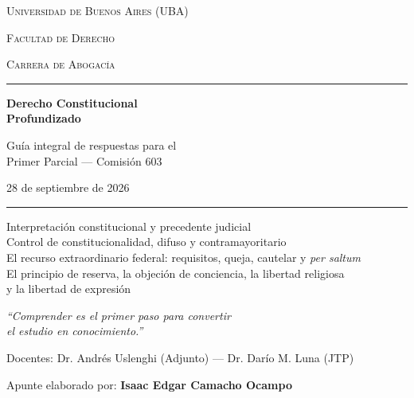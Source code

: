 \documentclass[12pt,oneside]{book}
\begin{document}
\begin{titlepage}
\centering
\vspace*{0.5cm}
{\large\scshape Universidad de Buenos Aires (UBA)\par}
{\large\scshape Facultad de Derecho\par}
{\large\scshape Carrera de Abogacía\par}
\vspace{1.2cm}
{\color{uba}\rule{0.6\textwidth}{1pt}}\par
\vspace{0.6cm}
{\Huge\bfseries\color{uba} Derecho Constitucional\\ Profundizado\par}
\vspace{0.4cm}
{\Large Guía integral de respuestas para el\\ Primer Parcial --- Comisión 603\par}
\vspace{0.3cm}
{\large 28 de septiembre de 2026\par}
\vspace{0.6cm}
{\color{uba}\rule{0.6\textwidth}{1pt}}\par
\vspace{1cm}

{\normalsize
Interpretación constitucional y precedente judicial \\
Control de constitucionalidad, difuso y contramayoritario \\
El recurso extraordinario federal: requisitos, queja, cautelar y \textit{per saltum} \\
El principio de reserva, la objeción de conciencia, la libertad religiosa \\
y la libertad de expresión
\par}

\vspace{1.3cm}
{\itshape\large ``Comprender es el primer paso para convertir\\ el estudio en conocimiento.''\par}
\vspace{1.5cm}

{\large Docentes: Dr. Andrés Uslenghi (Adjunto) --- Dr. Darío M. Luna (JTP)\par}
\vspace{0.3cm}
{\large Apunte elaborado por: \textbf{Isaac Edgar Camacho Ocampo}\par}


\end{titlepage}
\end{document}
